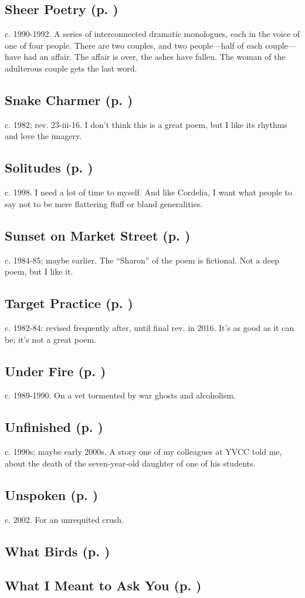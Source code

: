 \subsection*{Sheer Poetry (p. \pageref{ch:sheer_poetry})}
c. 1990-1992. A series of interconnected dramatic
monologues, each in the voice of one of four people. There are two
couples, and two people---half of each couple---have had an affair.
The affair is over, the ashes have fallen. The woman of the adulterous
couple gets the last word.

\subsection*{Snake Charmer (p. \pageref{ch:snake_charmer})}
c. 1982; rev. 23-iii-16. I don't think this is a great
poem, but I like its rhythms and love the
imagery.

\subsection*{Solitudes (p. \pageref{ch:solitudes})}
c. 1998. I need a lot of time to myself. And like
Cordelia, I want what people to say not to be mere flattering fluff or
bland generalities.

\subsection*{Sunset on Market Street (p. \pageref{ch:sunset_on_market_street})}
c. 1984-85; maybe earlier. The ``Sharon'' of the poem is
fictional. Not a deep poem, but I like it.

\subsection*{Target Practice (p. \pageref{ch:target_practice})}
c. 1982-84: revised frequently after, until final rev. in 2016. It's as good as it can be; it's not a great
poem.

\subsection*{Under Fire  (p. \pageref{ch:under_fire})}
c. 1989-1990. On a vet tormented by war ghosts and
alcoholism.

\subsection*{Unfinished (p. \pageref{ch:unfinished})}
c. 1990s; maybe early 2000s. A story one of my
colleagues at YVCC told me, about the death of the seven-year-old
daughter of one of his students.

\subsection*{Unspoken (p. \pageref{ch:unspoken})}
c. 2002. For an unrequited
crush.

\subsection*{What Birds (p. \pageref{ch:what_birds})}
\subsection*{What I Meant to Ask You (p. \pageref{ch:what_i_meant_to_ask})}